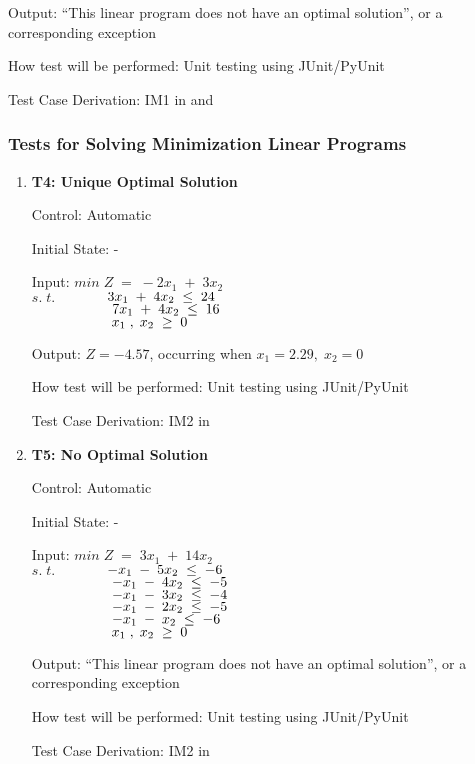 \documentclass[12pt, titlepage]{article}
\begin{document}
\begin{enumerate}
	Output: ``This linear program does not have an optimal solution'', or a 
	corresponding exception
	
	How test will be performed: Unit testing using JUnit/PyUnit
	
	Test Case Derivation: IM1 in \cite{losms-ca} and 
	\cite{simplex-special-situations}
\end{enumerate}

\subsubsection{Tests for Solving Minimization Linear Programs}

\begin{enumerate}
	\item{\textbf{T4: Unique Optimal Solution}}
	
	Control: Automatic 
	
	Initial State: -
	
	Input: $min\;Z\;=\;-2x_1\;+\;3x_2$\\
	$s.\;t.$$\hspace*{1.3cm} 3x_1\;+\;4x_2\; \leq \;24$\\
	$\hspace*{2cm} 7x_1\;+\;4x_2\; \leq \;16$\\
	$\hspace*{2cm} x_1\;,\;x_2\; \geq \;0$
	
	Output: $Z = -4.57$, occurring when $x_1=2.29,\;x_2=0$
	
	How test will be performed: Unit testing using JUnit/PyUnit
	
	Test Case Derivation: IM2 in \cite{losms-ca}
	
	\item{\textbf{T5: No Optimal Solution}}
	
	Control: Automatic 
	
	Initial State: -
	
	Input: $min\;Z\;=\;3x_1\;+\;14x_2$\\
	$s.\;t.$$\hspace*{1.3cm} -x_1\;-\;5x_2\; \leq \;-6$\\
	$\hspace*{2cm} -x_1\;-\;4x_2\; \leq \;-5$\\
	$\hspace*{2cm} -x_1\;-\;3x_2\; \leq \;-4$\\
	$\hspace*{2cm} -x_1\;-\;2x_2\; \leq \;-5$\\
	$\hspace*{2cm} -x_1\;-\;x_2\; \leq \;-6$\\
	$\hspace*{2cm} x_1\;,\;x_2\; \geq \;0$
	
	Output: ``This linear program does not have an optimal solution'', or a 
	corresponding exception
	
	How test will be performed: Unit testing using JUnit/PyUnit
	
	Test Case Derivation: IM2 in \cite{losms-ca}
\end{enumerate}
\end{document}
